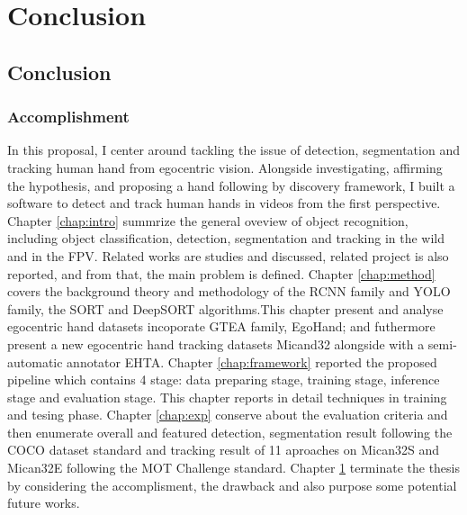 \chapter{Conclusion}\label{chap:conclusion}

\section{Conclusion}
\subsection{Accomplishment}
In this proposal, I center around tackling the issue of detection, segmentation and tracking human hand from egocentric vision. Alongside investigating, affirming the hypothesis, and proposing a hand following by discovery framework, I built a software to detect and track human hands in videos from the first perspective. Chapter \ref{chap:intro} summrize the general oveview of object recognition, including object classification, detection, segmentation and tracking in the wild and in the FPV. Related works are studies and discussed, related project is also reported, and from that, the main problem is defined. Chapter \ref{chap:method} covers the background theory and methodology of the RCNN family and YOLO family, the SORT and DeepSORT algorithms.This chapter present and analyse egocentric  hand datasets incoporate GTEA family, EgoHand; and futhermore present a new egocentric hand tracking datasets Micand32 alongside with a semi-automatic annotator EHTA. Chapter \ref{chap:framework} reported the proposed pipeline which contains 4 stage: data preparing stage, training stage, inference stage and evaluation stage. This chapter reports in detail techniques in training and tesing phase. Chapter \ref{chap:exp} conserve about the evaluation criteria and then enumerate overall and featured detection, segmentation result following the COCO dataset standard and tracking result of 11 aproaches on Mican32S and Mican32E following the MOT Challenge standard. Chapter \ref{chap:conclusion} terminate the thesis by considering the accomplisment, the drawback and also purpose some potential future works.
